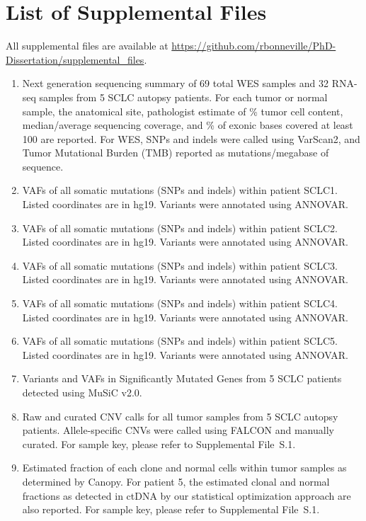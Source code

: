 \section{List of Supplemental Files}
All supplemental files are available at \url{https://github.com/rbonneville/PhD-Dissertation/supplemental_files}.
\begin{enumerate}
    \renewcommand*{\labelenumi}{S\thechapter{}.\arabic{enumi}. }
    \item Next generation sequencing summary of 69 total WES samples and 32 RNA-seq samples from 5 SCLC autopsy patients. For each tumor or normal sample, the anatomical site, pathologist estimate of \% tumor cell content, median/average sequencing coverage, and \% of exonic bases covered at least 100\texttimes{} are reported. For WES, SNPs and indels were called using VarScan2, and Tumor Mutational Burden (TMB) reported as mutations/megabase of sequence.
    \item VAFs of all somatic mutations (SNPs and indels) within patient SCLC1\@. Listed coordinates are in hg19. Variants were annotated using ANNOVAR\@.
    \item VAFs of all somatic mutations (SNPs and indels) within patient SCLC2\@. Listed coordinates are in hg19. Variants were annotated using ANNOVAR\@.
    \item VAFs of all somatic mutations (SNPs and indels) within patient SCLC3\@. Listed coordinates are in hg19. Variants were annotated using ANNOVAR\@.
    \item VAFs of all somatic mutations (SNPs and indels) within patient SCLC4\@. Listed coordinates are in hg19. Variants were annotated using ANNOVAR\@.
    \item VAFs of all somatic mutations (SNPs and indels) within patient SCLC5\@. Listed coordinates are in hg19. Variants were annotated using ANNOVAR\@.
    \item Variants and VAFs in Significantly Mutated Genes from 5 SCLC patients detected using MuSiC v2.0.
    \item Raw and curated CNV calls for all tumor samples from 5 SCLC autopsy patients. Allele-specific CNVs were called using FALCON and manually curated. For sample key, please refer to Supplemental File~S\thechapter{}.1.
    \item Estimated fraction of each clone and normal cells within tumor samples as determined by Canopy. For patient 5, the estimated clonal and normal fractions as detected in ctDNA by our statistical optimization approach are also reported. For sample key, please refer to Supplemental File~S\thechapter{}.1.

\end{enumerate}
